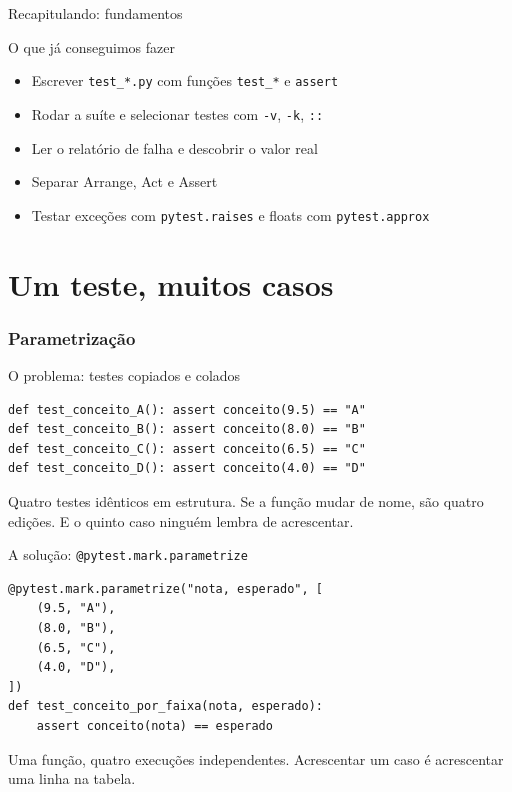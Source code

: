 \documentclass[aspectratio=169]{beamer}
\begin{document}
\begin{frame}{Recapitulando: fundamentos}
  \begin{block}{O que já conseguimos fazer}
    \begin{itemize}
      \item Escrever \texttt{test\_*.py} com funções \texttt{test\_*} e \texttt{assert}
      \item Rodar a suíte e selecionar testes com \texttt{-v}, \texttt{-k}, \texttt{::}
      \item Ler o relatório de falha e descobrir o valor real
      \item Separar Arrange, Act e Assert
      \item Testar exceções com \texttt{pytest.raises} e floats com \texttt{pytest.approx}
    \end{itemize}
  \end{block}
\end{frame}

\part{Um teste, muitos casos}
\section{Parametrização}

\begin{frame}[fragile]{O problema: testes copiados e colados}
\begin{lstlisting}
def test_conceito_A(): assert conceito(9.5) == "A"
def test_conceito_B(): assert conceito(8.0) == "B"
def test_conceito_C(): assert conceito(6.5) == "C"
def test_conceito_D(): assert conceito(4.0) == "D"
\end{lstlisting}
  \small Quatro testes idênticos em estrutura. Se a função mudar de nome,
  são quatro edições. E o quinto caso ninguém lembra de acrescentar.
\end{frame}

\begin{frame}[fragile]{A solução: \texttt{@pytest.mark.parametrize}}
\begin{lstlisting}
@pytest.mark.parametrize("nota, esperado", [
    (9.5, "A"),
    (8.0, "B"),
    (6.5, "C"),
    (4.0, "D"),
])
def test_conceito_por_faixa(nota, esperado):
    assert conceito(nota) == esperado
\end{lstlisting}
  \small Uma função, quatro execuções independentes. Acrescentar um caso
  é acrescentar uma linha na tabela.
\end{frame}
\end{document}
